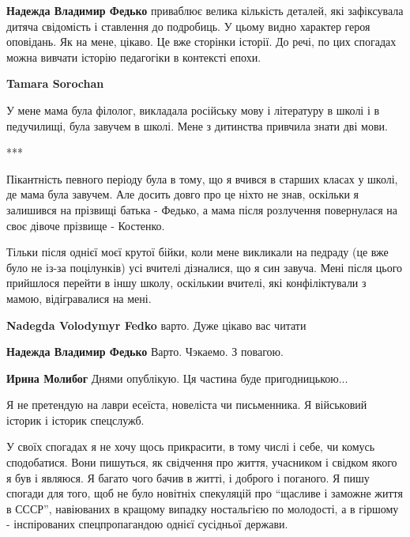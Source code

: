 \begin{itemize}
\begin{itemize}
\textbf{Надежда Владимир Федько} приваблює велика кількість деталей, які зафіксувала дитяча свідомість і ставлення до подробиць. У цьому видно характер героя оповідань. Як на мене, цікаво. Це вже сторінки історії. До речі, по цих спогадах можна вивчати історію педагогіки в контексті епохи.

\begin{itemize} %
\textbf{Tamara Sorochan} 

У мене мама була філолог, викладала російську мову і літературу в школі і в
педучилищі, була завучем в школі. Мене з дитинства привчила знати дві мови.

***

Пікантність певного періоду була в тому, що я вчився в старших класах у школі,
де мама була завучем. Але досить довго про це ніхто не знав, оскільки я
залишився на прізвищі батька - Федько, а мама після розлучення повернулася на
своє дівоче прізвище - Костенко.

Тільки після однієї моєї крутої бійки, коли мене викликали на педраду (це вже
було не із-за поцілунків) усі вчителі дізналися, що я син завуча. Мені після
цього прийшлося перейти в іншу школу, оскількии вчителі, які конфіліктували з
мамою, відігравалися на мені.

\end{itemize} %

\textbf{Nadegda Volodymyr Fedko} варто. Дуже цікаво вас читати

\textbf{Надежда Владимир Федько} Варто. Чэкаемо. З повагою.

\textbf{Ирина Молибог} Днями опублікую. Ця частина буде пригодницькою...

\end{itemize} %


Я не претендую на лаври есеїста, новеліста чи письменника. Я військовий історик
і історик спецслужб.

У своїх спогадах я не хочу щось прикрасити, в тому числі і себе, чи комусь
сподобатися. Вони пишуться, як свідчення про життя, учасником і свідком якого я
був і являюся. Я багато чого бачив в житті, і доброго і поганого. Я пишу
спогади для того, щоб не було новітніх спекуляцій про \enquote{щасливе і заможне життя
в СССР}, навіюваних в кращому випадку ностальгією по молодості, а в гіршому -
інспірованих спецпропагандою однієї сусідньої держави.


\end{itemize}
